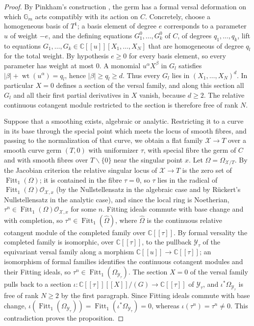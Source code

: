 \documentclass{amsart}
\theoremstyle{definition}
\theoremstyle{remark}
\numberwithin{equation}{section}
\newcommand{\CC}{\mathbb{C}}
\DeclareMathOperator{\Fitt}{Fitt}
\begin{document}
\begin{proof}
By Pinkham's construction \cite[Proposition~2.3 and (2.6)--(2.10)]{Pinkham}, the
germ has a formal versal deformation on which $\mathbb G_m$ acts compatibly with its
action on $C$. Concretely, choose a homogeneous basis of $T^1$; a basis element of
degree $e$ corresponds to a parameter $u$ of weight $-e$, and the defining equations
$G^0_1,\dots,G^0_k$ of $C$, of degrees $q_1,\dots,q_k$, lift to equations
$G_1,\dots,G_k\in\CC[[u]][X_1,\dots,X_N]$ that are homogeneous of degree $q_l$ for the
total weight. By hypothesis $e\ge0$ for every basis element, so every parameter has
weight at most $0$. A monomial $u^\alpha X^\beta$ in $G_l$ satisfies
$|\beta|+\operatorname{wt}(u^\alpha)=q_l$, hence $|\beta|\ge q_l\ge d$. Thus every
$G_l$ lies in $(X_1,\dots,X_N)^d$. In particular $X=0$ defines a section of the
versal family, and along this section all $G_l$ and all their first partial
derivatives in $X$ vanish, because $d\ge2$. The relative continuous cotangent module
restricted to the section is therefore free of rank $N$.

Suppose that a smoothing exists, algebraic or analytic. Restricting it to a curve in
its base through the special point which meets the locus of smooth fibres, and passing
to the normalization of that curve, we obtain a flat family $\mathcal X\to T$ over a
smooth curve germ $(T,0)$ with uniformizer $\tau$, with special fibre the germ of $C$
and with smooth fibres over $T\smallsetminus\{0\}$ near the singular point $x$. Let
$\Omega=\Omega_{\mathcal X/T}$. By the Jacobian criterion the relative singular locus of
$\mathcal X\to T$ is the zero set of $\Fitt_1(\Omega)$; it is contained in the fibre
$\tau=0$, so $\tau$ lies in the radical of $\Fitt_1(\Omega)\mathcal O_{\mathcal X,x}$
(by the Nullstellensatz in the algebraic case and by R\"uckert's Nullstellensatz in the
analytic case), and since the local ring is Noetherian, $\tau^n\in\Fitt_1(\Omega)
\mathcal O_{\mathcal X,x}$ for some $n$. Fitting ideals commute with base change and with
completion, so $\tau^n\in\Fitt_1(\widehat\Omega)$, where $\widehat\Omega$ is the
continuous relative cotangent module of the completed family over $\CC[[\tau]]$. By
formal versality the completed family is isomorphic, over $\CC[[\tau]]$, to the pullback
$\mathcal Y_\tau$ of the equivariant versal family along a morphism
$\CC[[u]]\to\CC[[\tau]]$; an isomorphism of formal families identifies the continuous
cotangent modules and their Fitting ideals, so $\tau^n\in\Fitt_1(\Omega_{\mathcal
Y_\tau})$. The section $X=0$ of the versal family pulls back to a section
$\iota\colon\CC[[\tau]][[X]]/(G)\to\CC[[\tau]]$ of $\mathcal Y_\tau$, and
$\iota^*\Omega_{\mathcal Y_\tau}$ is free of rank $N\ge2$ by the first paragraph.
Since Fitting ideals commute with base change, $\iota(\Fitt_1(\Omega_{\mathcal Y_\tau}))
=\Fitt_1(\iota^*\Omega_{\mathcal Y_\tau})=0$, whereas $\iota(\tau^n)=\tau^n\ne0$. This
contradiction proves the proposition.
\end{proof}
\end{document}
